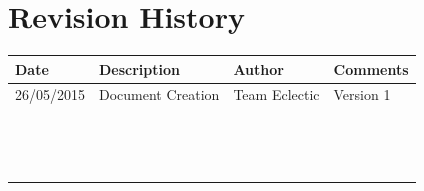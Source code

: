 \documentclass[11pt]{article}
\begin{document}


\setcounter{tocdepth}{3}
\setcounter{secnumdepth}{5}
\tableofcontents

\newpage
\section{Revision History}
\begin{table}[h]
\begin{tabular}{llll}
\textbf{Date}          & \textbf{Description}  & \textbf{Author}       & \textbf{Comments}   \\ \hline
\multicolumn{1}{|R{2cm}|}{26/05/2015} & \multicolumn{1}{L{4.5cm}|}{Document Creation} & \multicolumn{1}{l|}{Team Eclectic} & \multicolumn{1}{L{4cm}|}{Version 1} \\ \hline
\multicolumn{1}{|l|}{} & \multicolumn{1}{l|}{} & \multicolumn{1}{l|}{} & \multicolumn{1}{l|}{} \\ \hline
\multicolumn{1}{|l|}{} & \multicolumn{1}{l|}{} & \multicolumn{1}{l|}{} & \multicolumn{1}{l|}{} \\ \hline
\multicolumn{1}{|l|}{} & \multicolumn{1}{l|}{} & \multicolumn{1}{l|}{} & \multicolumn{1}{l|}{} \\ \hline
\multicolumn{1}{|l|}{} & \multicolumn{1}{l|}{} & \multicolumn{1}{l|}{} & \multicolumn{1}{l|}{} \\ \hline
\multicolumn{1}{|l|}{} & \multicolumn{1}{l|}{} & \multicolumn{1}{l|}{} & \multicolumn{1}{l|}{} \\ \hline
\multicolumn{1}{|l|}{} & \multicolumn{1}{l|}{} & \multicolumn{1}{l|}{} & \multicolumn{1}{l|}{} \\ \hline
\multicolumn{1}{|l|}{} & \multicolumn{1}{l|}{} & \multicolumn{1}{l|}{} & \multicolumn{1}{l|}{} \\ \hline
\multicolumn{1}{|l|}{} & \multicolumn{1}{l|}{} & \multicolumn{1}{l|}{} & \multicolumn{1}{l|}{} \\ \hline
\multicolumn{1}{|l|}{} & \multicolumn{1}{l|}{} & \multicolumn{1}{l|}{} & \multicolumn{1}{l|}{} \\ \hline
\multicolumn{1}{|l|}{} & \multicolumn{1}{l|}{} & \multicolumn{1}{l|}{} & \multicolumn{1}{l|}{} \\ \hline
\multicolumn{1}{|l|}{} & \multicolumn{1}{l|}{} & \multicolumn{1}{l|}{} & \multicolumn{1}{l|}{} \\ \hline
\multicolumn{1}{|l|}{} & \multicolumn{1}{l|}{} & \multicolumn{1}{l|}{} & \multicolumn{1}{l|}{} \\ \hline
\multicolumn{1}{|l|}{} & \multicolumn{1}{l|}{} & \multicolumn{1}{l|}{} & \multicolumn{1}{l|}{} \\ \hline
\multicolumn{1}{|l|}{} & \multicolumn{1}{l|}{} & \multicolumn{1}{l|}{} & \multicolumn{1}{l|}{} \\ \hline
\end{tabular}
\end{table}
\end{document}
